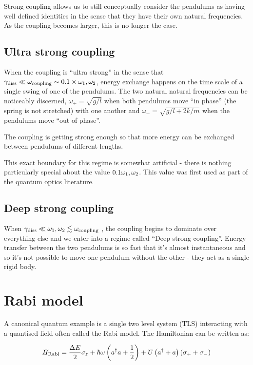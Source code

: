 \documentclass[
]{article}
\renewcommand{\[}{\begin{equation}}
\renewcommand{\]}{\end{equation}}
\begin{document}
Strong coupling allows us to still conceptually consider the pendulums
as having well defined identities in the sense that they have their own
natural frequencies. As the coupling becomes larger, this is no longer
the case.

\subsection{Ultra strong coupling}\label{ultra-strong-coupling}

When the coupling is ``ultra strong'' in the sense that
\(\gamma_{\rm diss} \ll \omega_{\rm coupling} \sim 0.1\times  \omega_1,\omega_2\),
energy exchange happens on the time scale of a single swing of one of
the pendulums. The two natural natural frequencies can be noticeably
discerned, \(\omega_+ = \sqrt{g/l}\) when both pendulums move ``in
phase'' (the spring is not stretched) with one another and
\(\omega_- = \sqrt{g/l + 2k/m}\) when the pendulums move ``out of
phase''.

The coupling is getting strong enough so that more energy can be
exchanged between pendulums of different lengths.

This exact boundary for this regime is somewhat artificial - there is
nothing particularly special about the value
\(0.1 \omega_{\rm 1}, \omega_2\). This value was first used as part of
the quantum optics literature.

\subsection{Deep strong coupling}\label{deep-strong-coupling}

When
\(\gamma_{\rm diss} \ll \omega_1,\omega_2 \lesssim \omega_{\rm coupling}\)
, the coupling begins to dominate over everything else and we enter into
a regime called ``Deep strong coupling''. Energy transfer between the
two pendulums is so fast that it's almost instantaneous and so it's not
possible to move one pendulum without the other - they act as a single
rigid body.

\section{Rabi model}\label{rabi-model}

A canonical quantum example is a single two level system (TLS)
interacting with a quantised field often called the Rabi model. The
Hamiltonian can be written as:

\[
H_{\rm Rabi} = \frac{\Delta E}{2} \sigma_z + \hbar\omega\left(a^{\dagger}a +\frac{1}{2}\right) + U\left( a^{\dagger} + a \right)(\sigma_+ + \sigma_-)
\label{eq:rabiH}
\]
\end{document}
